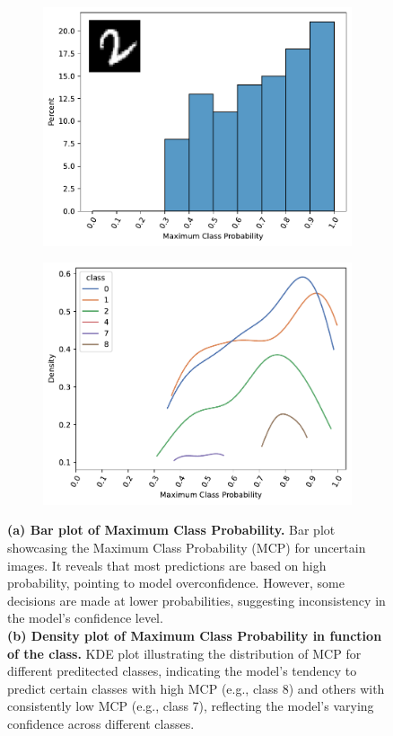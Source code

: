 \begin{figure}[H]
    \centering
    \begin{subfigure}{0.45\textwidth}
        \includegraphics[width=\textwidth]{MCP_barplot.pdf}
        \caption{}
        \label{fig:MCP:barplot}
    \end{subfigure}%
    \begin{subfigure}{0.45\textwidth}
        \includegraphics[width=\textwidth]{MCP_kdeplot.pdf}
        \caption{}
        \label{fig:MCP:kdeplot}
    \end{subfigure}%
    \caption{\textbf{(a) Bar plot of Maximum Class Probability.} Bar plot showcasing the Maximum Class Probability (MCP) for uncertain images. It reveals that most predictions are based on high probability, pointing to model overconfidence. However, some decisions are made at lower probabilities, suggesting inconsistency in the model's confidence level.\\\textbf{(b) Density plot of Maximum Class Probability in function of the class.} KDE plot illustrating the distribution of MCP for different preditected classes, indicating the model's tendency to predict certain classes with high MCP (e.g., class 8) and others with consistently low MCP (e.g., class 7), reflecting the model's varying confidence across different classes.}
    \label{fig:MCP}
\end{figure}


